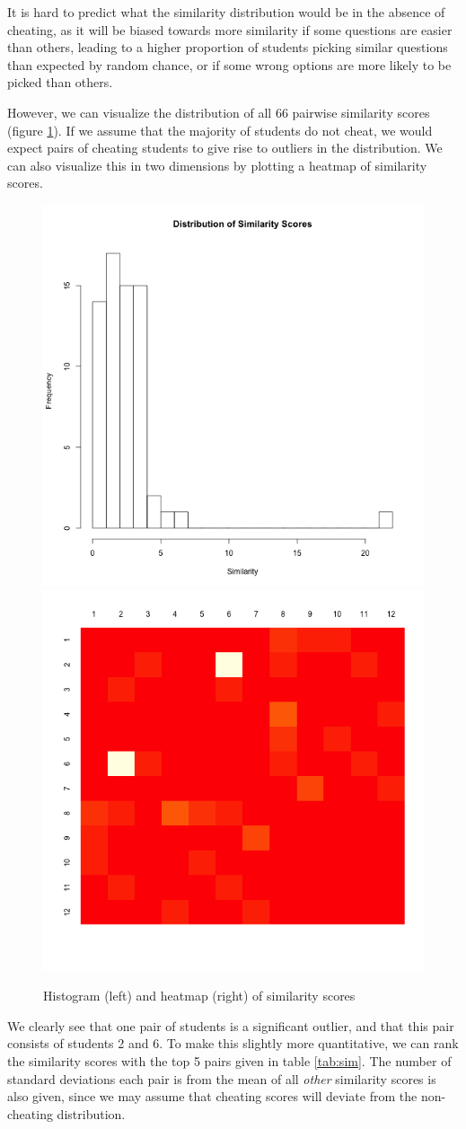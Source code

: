 \documentclass{article}
\begin{document}
It is hard to predict what the similarity distribution would be in the absence of cheating, as it will be biased towards more similarity if some questions are easier than others, leading to a higher proportion of students picking similar questions than expected by random chance, or if some wrong options are more likely to be picked than others.

However, we can visualize the distribution of all 66 pairwise similarity scores (figure \ref{fig:cheat_hist}). If we assume that the majority of students do not cheat, we would expect pairs of cheating students to give rise to outliers in the distribution. We can also visualize this in two dimensions by plotting a heatmap of similarity scores. 

\begin{figure}[h]
\centering

\includegraphics[width=0.4 \linewidth,trim={0 0 0 0}, clip=true]{cheat_hist.png}
\includegraphics[width=0.4 \linewidth,trim={0 0 0 0}, clip=true]{cheat_heat.png}

\caption{Histogram (left) and heatmap (right) of similarity scores}
\label{fig:cheat_hist}


\end{figure}

We clearly see that one pair of students is a significant outlier, and that this pair consists of students 2 and 6. To make this slightly more quantitative, we can rank the similarity scores with the top 5 pairs given in table \ref{tab:sim}. The number of standard deviations each pair is from the mean of all \textit{other} similarity scores is also given, since we may assume that cheating scores will deviate from the non-cheating distribution.
\end{document}
